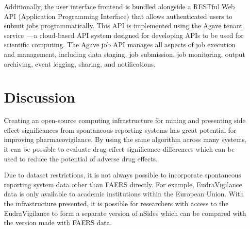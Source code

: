 \documentclass{ws-procs11x85}
\begin{document}
Additionally, the user interface frontend is bundled alongside a
RESTful Web API (Application Programming Interface) that allows
authenticated users to submit jobs programmatically. This API is
implemented using the Agave tenant service~\cite{dooley2012agave}---a
cloud-based API system designed for developing APIs to be used for
scientific computing. The Agave job API manages all aspects of job
execution and management, including data staging, job submission, job
monitoring, output archiving, event logging, sharing, and
notifications.

\section{Discussion}

Creating an open-source computing infrastructure for mining and
presenting side effect significances from spontaneous reporting
systems has great potential for improving pharmacovigilance. By using
the same algorithm across many systems, it can be possible to evaluate
drug effect significance differences which can be used to reduce the
potential of adverse drug effects.

Due to dataset restrictions, it is not always possible to incorporate
spontaneous reporting system data other than FAERS directly.  For
example, EudraVigilance data is only available to academic
institutions within the European Union. With the infrastructure
presented, it is possible for researchers with access to the
EudraVigilance to form a separate version of nSides which can be
compared with the version made with FAERS data.






\end{document}
